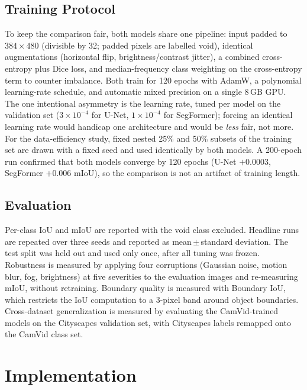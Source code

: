 \documentclass[11pt,a4paper]{article}
\begin{document}
\subsection{Training Protocol}

To keep the comparison fair, both models share one pipeline: input padded to
$384\times480$ (divisible by 32; padded pixels are labelled void), identical
augmentations (horizontal flip, brightness/contrast jitter), a combined
cross-entropy plus Dice loss, and median-frequency class weighting on the
cross-entropy term to counter imbalance. Both train for 120 epochs with AdamW,
a polynomial learning-rate schedule, and automatic mixed precision on a single
8\,GB GPU. The one intentional asymmetry is the learning rate, tuned per model
on the validation set ($3\times10^{-4}$ for U-Net, $1\times10^{-4}$ for
SegFormer); forcing an identical learning rate would handicap one architecture
and would be \emph{less} fair, not more. For the data-efficiency study, fixed
nested 25\% and 50\% subsets of the training set are drawn with a fixed seed and
used identically by both models. A 200-epoch run confirmed that both models
converge by 120 epochs (U-Net $+0.0003$, SegFormer $+0.006$ mIoU), so the
comparison is not an artifact of training length.

\subsection{Evaluation}

Per-class IoU and mIoU are reported with the void class excluded. Headline runs
are repeated over three seeds and reported as mean\,$\pm$\,standard deviation.
The test split was held out and used only once, after all tuning was frozen.
Robustness is measured by applying four corruptions (Gaussian noise, motion
blur, fog, brightness) at five severities to the evaluation images and
re-measuring mIoU, without retraining. Boundary quality is measured with
Boundary IoU, which restricts the IoU computation to a 3-pixel band around
object boundaries. Cross-dataset generalization is measured by evaluating the
CamVid-trained models on the Cityscapes validation set, with Cityscapes labels
remapped onto the CamVid class set.

\section{Implementation}
\end{document}
